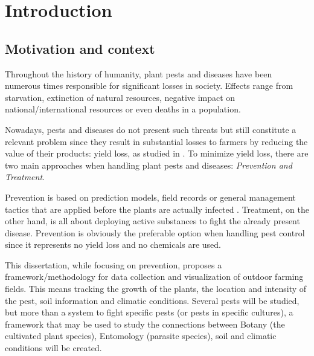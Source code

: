 \newcommand{\novathesis}{\emph{novathesis}}
\newcommand{\novathesisclass}{\texttt{novathesis.cls}}


\chapter{Introduction}
\label{cha:introduction}

\section{Motivation and context} %
\label{sec:motivation_and_content}

Throughout the history of humanity, plant pests and diseases have been numerous times responsible for significant losses in society. Effects range from starvation, extinction of natural resources, negative impact on national/international resources or even deaths in a population.

Nowadays, pests and diseases do not present such threats but still constitute a relevant problem since they result in substantial losses to farmers by reducing the value of their products: yield loss, as studied in \cite{Kamilaris2017}\cite{Walker1983}. To minimize yield loss, there are two main approaches when handling plant pests and diseases: \emph{Prevention and Treatment}.

Prevention is based on prediction models, field records or general management tactics that are applied before the plants are actually infected \cite{StuartB.Hill}. Treatment, on the other hand, is all about deploying active substances to fight the already present disease. Prevention is obviously the preferable option when handling pest control since it represents no yield loss and no chemicals are used.

This dissertation, while focusing on prevention, proposes a framework/methodology for data collection and visualization of outdoor farming fields. This means tracking the growth of the plants, the location and intensity of the pest, soil information and climatic conditions. Several pests will be studied, but more than a system to fight specific pests (or pests in specific cultures), a framework that may be used to study the connections between Botany (the cultivated plant species), Entomology (parasite species), soil and climatic conditions will be created. 


